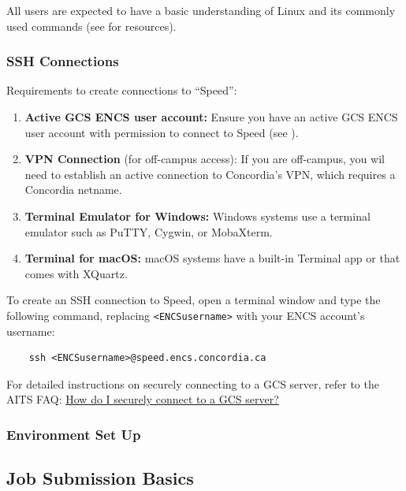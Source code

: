 \documentclass{easychair}
\begin{document}
All users are expected to have a basic understanding of
Linux and its commonly used commands (see  for resources).

\subsubsection{SSH Connections}
\label{sect:ssh}

Requirements to create connections to ``Speed'':
\begin{enumerate}
	\item \textbf{Active GCS ENCS user account:} Ensure you have an active GCS ENCS user account with 
	permission to connect to Speed (see ).
	\item \textbf{VPN Connection} (for off-campus access): If you are off-campus, you wil need to establish an active connection to Concordia’s VPN, 
	which requires a Concordia netname.
	\item \textbf{Terminal Emulator for Windows:} Windows systems use a terminal emulator such as PuTTY, Cygwin, or MobaXterm.
	\item \textbf{Terminal for macOS:} macOS systems have a built-in Terminal app or  that comes with XQuartz.
\end{enumerate}

\noindent To create an SSH connection to Speed, open a terminal window and type the following command, replacing \verb!<ENCSusername>! with your ENCS account’s username:
\begin{verbatim}
    ssh <ENCSusername>@speed.encs.concordia.ca
\end{verbatim}

\noindent For detailed instructions on securely connecting to a GCS server, refer to the AITS FAQ: 
\href{https://www.concordia.ca/ginacody/aits/support/faq/ssh-to-gcs.html}{How do I securely connect to a GCS server?}

\subsubsection{Environment Set Up}
\label{sect:envsetup}


\subsection{Job Submission Basics}
\label{sect:job-submission-basics}
\end{document}
